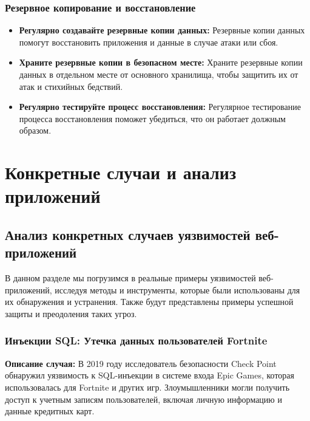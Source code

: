 \documentclass[a4paper,12pt]{diplom}
\begin{document}
	 \subsection{Резервное копирование и восстановление}
	 
	 \begin{itemize}
	 	\item \textbf{Регулярно создавайте резервные копии данных:} Резервные копии данных помогут восстановить приложения и данные в случае атаки или сбоя.
	 	\item \textbf{Храните резервные копии в безопасном месте:} Храните резервные копии данных в отдельном месте от основного хранилища, чтобы защитить их от атак и стихийных бедствий.
	 	\item \textbf{Регулярно тестируйте процесс восстановления:} Регулярное тестирование процесса восстановления поможет убедиться, что он работает должным образом.
	 \end{itemize}
	 
	 
	 				
	 				
	 
	 
	 
	  
	 
	 
	 
	 
	 
	 
	 
	 
	 
	 
	 
	 
	 
	 \chapter{Конкретные случаи и анализ приложений}
	 
	 \section{Анализ конкретных случаев уязвимостей веб-приложений}
	 
	 В данном разделе мы погрузимся в реальные примеры уязвимостей веб-приложений, исследуя методы и инструменты, которые были использованы для их обнаружения и устранения. Также будут представлены примеры успешной защиты и преодоления таких угроз.
	 
	 \subsection{Инъекции SQL: Утечка данных пользователей Fortnite}
	 
	 \textbf{Описание случая:} В 2019 году исследователь безопасности Check Point обнаружил уязвимость к SQL-инъекции в системе входа Epic Games, которая использовалась для Fortnite и других игр.  Злоумышленники могли получить доступ к учетным записям пользователей, включая личную информацию и данные кредитных карт.
	 
\end{document}
